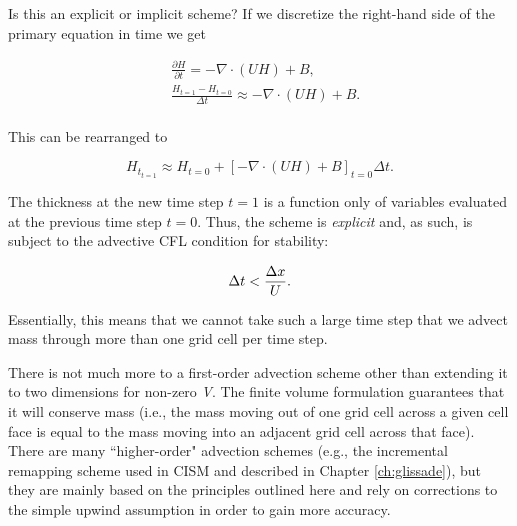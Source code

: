 Is this an explicit or implicit scheme? If we discretize the right-hand side of the primary equation in time we get

\begin{equation}
\begin{split}
  & \frac{\partial H}{\partial t}=-\nabla \cdot \left( UH \right)+B, \\
 & \frac{H_{t=1}-H_{t=0}}{\Delta t}\approx -\nabla \cdot \left( UH \right)+B.\\
\end{split}
\end{equation}

\noindent
This can be rearranged to

\begin{equation}
H_{t_{t=1}}\approx H_{t=0}+\left[ -\nabla \cdot \left( UH \right)+B \right]_{t=0}\Delta t.
\end{equation}

\noindent
The thickness at the new time step $t=1$ is a function only of variables evaluated at the previous time step $t=0$. Thus, the scheme is \textit{explicit} and, as such, is subject to the advective CFL condition for stability:

\begin{equation}
\Delta t<\frac{\Delta x}{U}.\\
\end{equation}

\noindent
Essentially, this means that we cannot take such a large time step that we advect mass through more than one grid cell per time step.

There is not much more to a first-order advection scheme other than extending it to two dimensions for non-zero \textit{V}. The finite volume formulation guarantees that it will conserve mass (i.e., the mass moving out of one grid cell across a given cell face is equal to the mass moving into an adjacent grid cell across that face).
There are many ``higher-order" advection schemes (e.g., the incremental remapping scheme used in CISM and described in Chapter \ref{ch:glissade}), but they are mainly based on the principles outlined here and rely on corrections to the simple upwind assumption in order to gain more accuracy.
